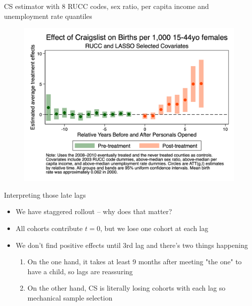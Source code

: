 \documentclass{beamer}
\begin{document}
\begin{frame}{CS estimator with 8 RUCC codes, sex ratio, per capita income and unemployment rate quantiles}

\begin{figure}
    \centering
    \includegraphics[height=0.85\textheight]{./lecture_includes/es_births_allX.png}
\end{figure}

\end{frame}

\begin{frame}{Interpreting those late lags}

\begin{itemize}
\item We have staggered rollout -- why does that matter?
\item All cohorts contribute $t=0$, but we lose one cohort at each lag
\item We don't find positive effects until 3rd lag and there's two things happening
	\begin{enumerate}
	\item On the one hand, it takes at least 9 months after meeting "the one" to have a child, so lags are reassuring
	\item On the other hand, CS is literally losing cohorts with each lag so mechanical sample selection
	\end{enumerate}

\end{itemize}

\end{frame}
\end{document}
